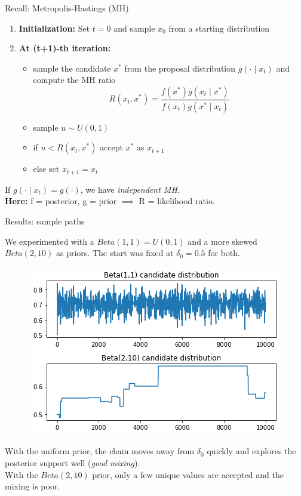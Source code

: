 \begin{frame}{Recall: Metropolis-Hastings (MH)}
	
		\begin{enumerate}
		\item \textbf{Initialization:} Set $t=0$ and sample $x_0$ from a starting distribution
		\item \textbf{At (t+1)-th iteration:} 
			\begin{itemize}
				\item sample the candidate $x^*$ from the proposal distribution $g(\cdot \mid x_t)$
				and compute the MH ratio
				$$ R(x_t,x^*) = \frac{f(x^*)g(x_t \mid x^*)}{f(x_t)g(x^* \mid x_t)}$$
				\item sample $u \sim U(0,1)$
				\item if $u < R(x_t,x^*)$ accept $x^*$ as $x_{t+1}$
				\item else set $x_{t+1}=x_t$
			\end{itemize}
		\end{enumerate}
	
	If $g(\cdot \mid x_t) =  g(\cdot)$, we have \textit{independent MH}.\\
	\vspace{.1in}
\textbf{Here:} f = posterior, g = prior $\implies$ R = likelihood ratio.
	
\end{frame}

\begin{frame}{Results: sample paths}

We experimented with a $Beta(1,1)=U(0,1)$ and a more skewed $Beta(2,10)$ as priors. The start was fixed at $\delta_0=0.5$ for both.
\begin{figure}
	\centering
	\includegraphics[width=0.5\columnwidth]{images/MCMC_chains.png}
\end{figure}
With the uniform prior, the chain moves away from $\delta_0$ quickly and explores the posterior support well (\textit{good mixing}).\\
\vspace{.1in}
With the $Beta(2,10)$ prior, only a few unique values are accepted and the mixing is poor.

\end{frame}

